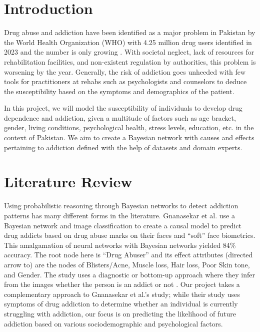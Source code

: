 \documentclass[conference]{IEEEtran}
\begin{document}
\section{Introduction}
Drug abuse and addiction have been identified as a major problem in Pakistan by the World Health Organization (WHO) \cite{emhj_drug_users_karachi} with 4.25 million drug users identified in 2023 and the number is only growing \cite{unodc_survey_drug_use_pakistan}. With societal neglect, lack of resources for rehabilitation facilities, and non-existent regulation by authorities, this problem is worsening by the year. Generally, the risk of addiction goes unheeded with few tools for practitioners at rehabs such as psychologists and counselors to deduce the susceptibility based on the symptoms and demographics of the patient. 

In this project, we will model the susceptibility of individuals to develop drug dependence and addiction, given a multitude of factors such as age bracket, gender, living conditions, psychological health, stress levels, education, etc. in the context of Pakistan. We aim to create a Bayesian network with causes and effects pertaining to addiction defined with the help of datasets and domain experts. 

\section{Literature Review}
Using probabilistic reasoning through Bayesian networks to detect addiction patterns has many different forms in the literature. Gnanasekar et al. use a Bayesian network and image classification to create a causal model to predict drug addicts based on drug abuse marks on their faces and “soft” face biometrics. This amalgamation of neural networks with Bayesian networks yielded 84\% accuracy. The root node here is “Drug Abuser” and its effect attributes (directed arrow to) are the nodes of Blisters/Acne, Muscle loss, Hair loss, Poor Skin tone, and Gender. The study uses a diagnostic or bottom-up approach where they infer from the images whether the person is an addict or not \cite{gnanasekar_face_attributes_drug_addicts}. Our project takes a complementary approach to Gnanasekar et al.’s study; while their study uses symptoms of drug addiction to determine whether an individual is currently struggling with addiction, our focus is on predicting the likelihood of future addiction based on various sociodemographic and psychological factors.
\end{document}
